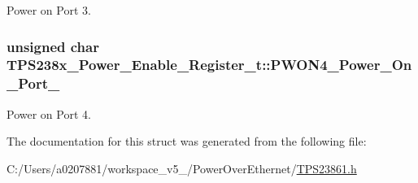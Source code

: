Power on Port 3. 

\hypertarget{struct_t_p_s238x___power___enable___register__t_a04e97576400bff6014bff06659c3ca7d}{
\subsubsection[{P\-W\-O\-N4\-\_\-\-Power\-\_\-\-On\-\_\-\-Port\-\_\-4}]{\setlength{\rightskip}{0pt plus 5cm}unsigned char T\-P\-S238x\-\_\-\-Power\-\_\-\-Enable\-\_\-\-Register\-\_\-t\-::\-P\-W\-O\-N4\-\_\-\-Power\-\_\-\-On\-\_\-\-Port\-\_}}\label{struct_t_p_s238x___power___enable___register__t_a04e97576400bff6014bff06659c3ca7d}


Power on Port 4. 



The documentation for this struct was generated from the following file\-:\begin{DoxyCompactItemize}
\item 
C\-:/\-Users/a0207881/workspace\-\_\-v5\-\_/\-Power\-Over\-Ethernet/\hyperlink{_t_p_s23861_8h}{T\-P\-S23861.\-h}\end{DoxyCompactItemize}
